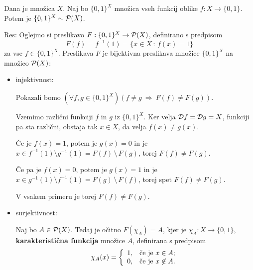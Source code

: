 \documentclass[11pt,paper=b5,footinclude,headinclude]{scrbook} %
\newcounter{example}
\def\sledi {{~\Rightarrow~}}
\def\brez {{\,\setminus\,}}
\begin{document}
\begin{example*}

Dana je množica $X$. Naj bo $\{0,1\}^X$ množica vseh funkcij oblike $f: X\to \{0,1\}$.
Potem je $\{0,1\}^X\sim {\cal P}(X)$.

Res:
Oglejmo si preslikavo
$F:\{0,1\}^X\to {\cal P}(X)$, definirano s predpisom
$$F(f) = f^{-1}(1) = \{x\in X\,:\,f(x) = 1\}$$
za vse $f\in \{0,1\}^X$.
Preslikava $F$ je bijektivna preslikava množice $\{0,1\}^X$ na množico ${\cal P}(X)$:
\begin{itemize}
  \item injektivnost:

Pokazali bomo $(\forall f,g\in \{0,1\}^X)(f\neq g\sledi F(f)\neq F(g))$.

Vzemimo različni funkciji $f$ in $g$ iz $\{0,1\}^X$. Ker velja ${\cal D}f = {\cal D}g = X$, funkciji pa sta različni,
obstaja tak $x\in X$, da velja $f(x) \neq g(x)$.

Če je $f(x) = 1$, potem je $g(x) = 0$ in je $x\in f^{-1}(1) \setminus g^{-1}(1) = F(f)\brez F(g)$, torej $F(f)\neq F(g)$.

Če pa je $f(x) = 0$, potem je $g(x) = 1$ in je $x\in g^{-1}(1) \setminus f^{-1}(1) = F(g)\brez F(f)$, torej spet $F(f)\neq F(g)$.

V vsakem primeru je torej $F(f) \neq F(g)$.

  \item surjektivnost:

  Naj bo $A\in {\cal P}(X)$. Tedaj je očitno $F(\chi_A) = A$, kjer je ${\chi_A}:X\to \{0,1\}$, \textbf{karakteristična funkcija}
  množice $A$, definirana s predpisom
  $$\chi_A(x) = \left\{
  \begin{array}{ll}
              1, & \hbox{če je $x\in A$;} \\
              0, & \hbox{če je $x\not\in A$.}
            \end{array}
          \right.$$
\end{itemize}
\end{example*}
\end{document}
